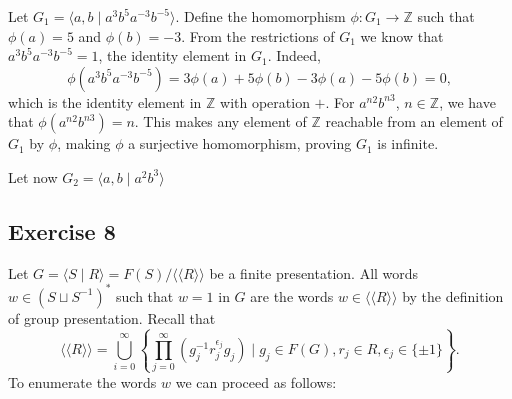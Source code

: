 \documentclass[11pt,a4paper]{article}
\newcommand{\Z}{\mathbb Z}
\begin{document}
Let $ G_1 = \langle a, b \mid a^3 b^5 a^{-3} b^{-5} \rangle $.  Define the homomorphism $ \phi \colon G_1  \to \Z $ such that $ \phi(a) = 5 $ and $ \phi(b) = -3 $. From the restrictions of $ G_1 $ we know that $ a^3 b^5 a^{-3} b^{-5} = 1 $, the identity element in $ G_1 $. Indeed,
$$
  \phi (a^3 b^5 a^{-3} b^{-5}) = 3\phi(a) + 5\phi(b) - 3 \phi(a) - 5 \phi(b) = 0,
$$
which is the identity element in $ \Z $ with operation $ + $. For $ a^{n2} b^{n3} $, $ n \in \Z $, we have that $ \phi(a^{n2} b^{n3}) = n $. This makes any element of $ \Z$ reachable from an element of $ G_1 $ by $ \phi $, making $ \phi $ a surjective homomorphism, proving $ G_1 $ is infinite.

Let now $ G_2 = \langle a, b \mid a^2 b^3 \rangle $

\subsection*{Exercise 8}
Let $ G = \langle S \mid R \rangle = F(S) / \langle \langle R \rangle \rangle $ be a finite presentation. All words $ w \in (S \sqcup S^{-1})^* $ such that $ w = 1 $ in $ G $ are the words $ w \in \langle \langle R \rangle \rangle $ by the definition of group presentation. Recall that
$$
  \langle \langle R \rangle \rangle = \bigcup_{i=0}^\infty \left\{ \prod_{j=0}^\infty (g_j^{-1} r_j^{\epsilon_j} g_j) \mid g_j \in F(G), r_j \in R, \epsilon_j \in \{ \pm 1 \} \right\}.
$$
To enumerate the words $ w $ we can proceed as follows:
\end{document}
